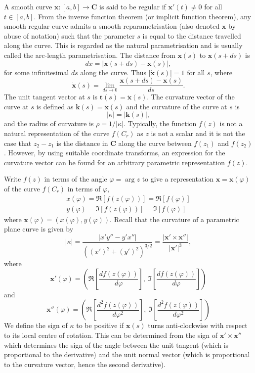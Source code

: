\documentclass{article}
\begin{document}
A smooth curve \(\mathbf{x}: [a,b] \to \mathbf{C}\) is said to be regular if \(\mathbf{x}'(t) \neq 0\) for all \(t \in [a, b]\). From the inverse function theorem (or implicit function theorem), any smooth regular curve admits a smooth reparametrisation (also denoted \(\mathbf{x}\) by abuse of notation) such that the parameter \(s\) is equal to the distance travelled along the curve. This is regarded as the natural parametrisation and is usually called the arc-length parametrisation. The distance from \(\mathbf{x}(s)\) to \(\mathbf{x}(s+ds)\) is
\[ dx = |\mathbf{x}(s+ds) - \mathbf{x}(s)|, \]
for some infinitesimal \(ds\) along the curve. Thus \(|\dot{\mathbf{x}}(s)| = 1\) for all \(s\), where
\[ \dot{\mathbf{x}}(s) = \lim_{ds \to 0} \frac{\mathbf{x}(s+ds) - \mathbf{x}(s)}{ds}. \]
The unit tangent vector at \(s\) is \(\mathbf{t}(s) = \dot{\mathbf{x}}(s)\). The curvature vector of the curve at \(s\) is defined as \(\mathbf{k}(s) = \ddot{\mathbf{x}}(s)\) and the curvature of the curve at \(s\) is 
\[ |\kappa| = |\mathbf{k}(s)|, \]
and the radius of curvature is \(\rho = 1/|\kappa|\). Typically, the function \(f(z)\) is not a natural representation of the curve \(f(C_r)\) as \(z\) is not a scalar and it is not the case that \(z_2-z_1\) is the distance in \(\mathbf{C}\) along the curve between \(f(z_1)\) and \(f(z_2)\). However, by using suitable coordinate transforms, an expression for the curvature vector can be found for an arbitrary parametric representation \(f(z)\).

Write \(f(z)\) in terms of the angle \(\varphi = \arg z\) to give a representation \(\mathbf{x} = \mathbf{x}(\varphi)\) of the curve \(f(C_r)\) in terms of \(\varphi\),
\begin{eqnarray*} 
    x(\varphi) = \Re[f(z(\varphi))]  = \Re[f(\varphi)] \\
    y(\varphi) = \Im[f(z(\varphi))]  = \Im[f(\varphi)]
\end{eqnarray*}
where \(\mathbf{x}(\varphi) = (x(\varphi), y(\varphi))\). Recall that the curvature of a parametric plane curve is given by
\[ |\kappa| = \frac{|x'y'' - y'x''|}{((x')^2 + (y')^2)^{3/2}} = \frac{|\mathbf{x}' \times \mathbf{x}''|}{|\mathbf{x}'|^3}, \]
where 
\[ \mathbf{x}'(\varphi) = \left( \Re\left[\frac{df(z(\varphi))}{d\varphi}\right], \ \Im\left[\frac{df(z(\varphi))}{d\varphi}\right] \right) \]
and
\[ \mathbf{x}''(\varphi) = \left( \Re\left[\frac{d^2f(z(\varphi))}{d\varphi^2}\right], \ \Im\left[\frac{d^2f(z(\varphi))}{d\varphi^2}\right] \right) \]
We define the sign of \(\kappa\) to be positive if \(\mathbf{x}(s)\) turns anti-clockwise with respect to its local centre of rotation. This can be determined from the sign of \(\mathbf{x}' \times \mathbf{x}''\) which determines the sign of the angle between the unit tangent (which is proportional to the derivative) and the unit normal vector (which is proportional to the curvature vector, hence the second derivative).
\end{document}
